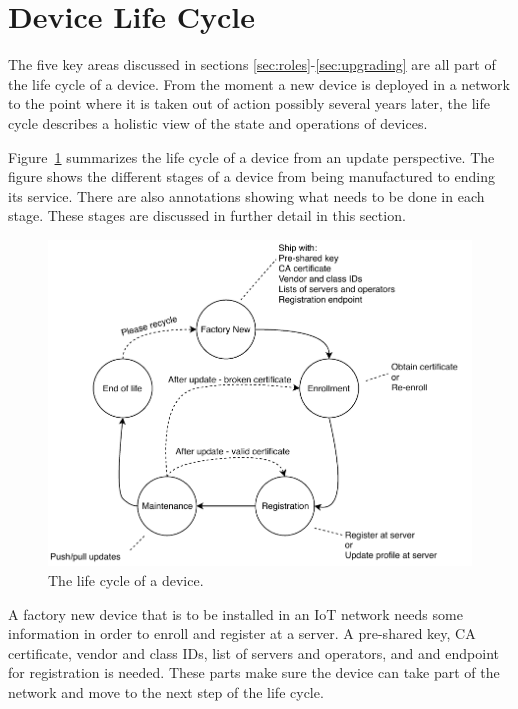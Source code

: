 \documentclass[0-thesis.tex]{subfiles}
\begin{document}
\section{Device Life Cycle}
\label{sec:device-lifecycle}
The five key areas discussed in sections \ref{sec:roles}-\ref{sec:upgrading} are all part
of the life cycle of a device. From the moment a new device is deployed in a network to
the point where it is taken out of action possibly several years later, the life cycle
describes a holistic view of the state and operations of devices.

Figure~\ref{fig:lifecycle} summarizes the life cycle of a device from an update
perspective. The figure shows the different stages of a device from being manufactured to
ending its service. There are also annotations showing what needs to be done in each
stage. These stages are discussed in further detail in this section.

\begin{figure}
    \caption{The life cycle of a device.}
    \label{fig:lifecycle}
    \includegraphics{images/lifecycle.pdf}
\end{figure}

A factory new device that is to be installed in an IoT network needs some information in
order to enroll and register at a server. A pre-shared key, CA certificate, vendor and
class IDs, list of servers and operators, and and endpoint for registration is needed.
These parts make sure the device can take part of the network and move to the next step of
the life cycle. 
\end{document}
